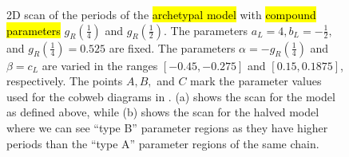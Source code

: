 \begin{figure}
	\centering
	\caption[2D scans of the periods of the archetypal model]{
		2D scan of the periods of the \hl{archetypal model} with \hl{compound parameters} $g_R\left(\frac{1}{4}\right)$ and $g_R\left(\frac{1}{2}\right)$.
		The parameters $a_L = 4, b_L = -\frac{1}{2},$ and $g_R\left(\frac{1}{4}\right) = 0.525$ are fixed.
		The parameters $\alpha = -g_R\left(\frac{1}{4}\right)$ and $\beta = c_L$ are varied in the ranges $[-0.45, -0.275]$ and $[0.15, 0.1875]$, respectively.
		The points $A, B,$ and $C$ mark the parameter values used for the cobweb diagrams in .
		(a) shows the scan for the model as defined above, while (b) shows the scan for the halved model where we can see ``type B'' parameter regions as they have higher periods than the ``type A'' parameter regions of the same chain.
	}
	\label{fig:setup.arch.period}
\end{figure}

